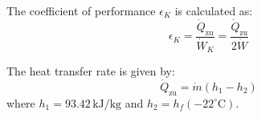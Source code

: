The coefficient of performance \( \epsilon_K \) is calculated as:  
\[
\epsilon_K = \frac{\dot{Q}_{\text{zu}}}{\dot{W}_K} = \frac{\dot{Q}_{\text{zu}}}{2 \dot{W}}
\]  

The heat transfer rate is given by:  
\[
\dot{Q}_{\text{zu}} = \dot{m} (h_1 - h_2)
\]  
where \( h_1 = 93.42 \, \text{kJ/kg} \) and \( h_2 = h_f(-22^\circ\text{C}) \).